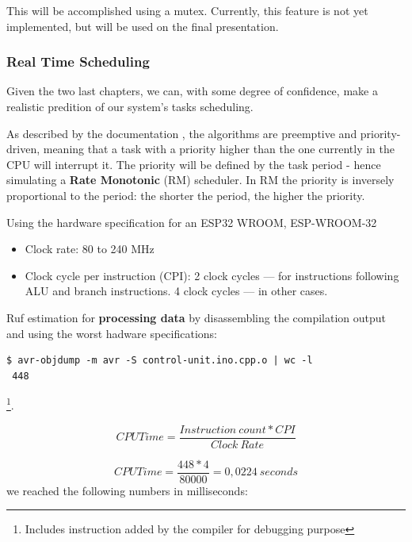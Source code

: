 \documentclass[11pt]{article}
\begin{document}
This will be accomplished using a mutex. Currently, this feature is not yet implemented, but will be used on the final presentation.

\subsubsection{Real Time Scheduling}

Given the two last chapters, we can, with some degree of confidence, make a realistic predition of our system's tasks scheduling. 

As described by the documentation \cite{c1}, the algorithms are preemptive and priority- driven, meaning that a task with a priority higher than the one currently in the CPU will interrupt it. The priority will be defined by the task period - hence simulating a \textbf{Rate Monotonic} (RM) scheduler. In RM the priority is inversely proportional to the period: the shorter the period, the higher the priority. 

Using the hardware specification for an ESP32 WROOM, 
\newline
\newline
ESP-WROOM-32 \cite{c2} 
\begin{itemize}
	\item Clock rate: 80 to 240 MHz
	\item Clock cycle per instruction (CPI): 2 clock cycles — for instructions following ALU and branch instructions. 4 clock cycles — in other cases.
\end{itemize}

\noindent
Ruf estimation for \textbf{processing data} by disassembling the compilation output and using the worst hadware specifications:

\begin{verbatim}
$ avr-objdump -m avr -S control-unit.ino.cpp.o | wc -l
 448 
\end{verbatim}
\footnote{Includes instruction added by the compiler for debugging purpose}. 

\begin{equation} 
	CPU Time =  \frac{Instruction\ count * CPI}{Clock\ Rate}
\end{equation}

\begin{equation} 
	CPU Time =  \frac{448 * 4}{80 000} = 0,0224\ seconds
\end{equation}
\newline
\newline
we reached the following numbers in milliseconds:
\end{document}
